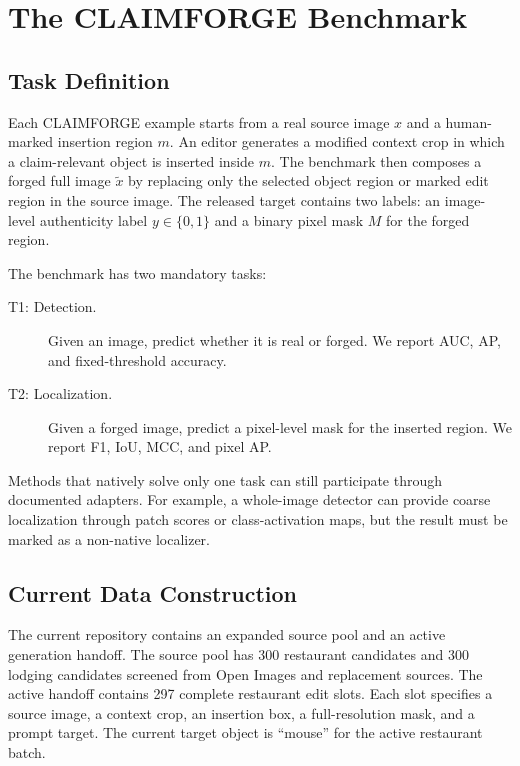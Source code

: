\section{The CLAIMFORGE Benchmark}
\label{sec:benchmark}

\subsection{Task Definition}

Each CLAIMFORGE example starts from a real source image $x$ and a human-marked insertion region $m$. An editor generates a modified context crop in which a claim-relevant object is inserted inside $m$. The benchmark then composes a forged full image $\tilde{x}$ by replacing only the selected object region or marked edit region in the source image. The released target contains two labels: an image-level authenticity label $y \in \{0,1\}$ and a binary pixel mask $M$ for the forged region.

The benchmark has two mandatory tasks:
\begin{description}
    \item[T1: Detection.] Given an image, predict whether it is real or forged. We report AUC, AP, and fixed-threshold accuracy.
    \item[T2: Localization.] Given a forged image, predict a pixel-level mask for the inserted region. We report F1, IoU, MCC, and pixel AP.
\end{description}
Methods that natively solve only one task can still participate through documented adapters. For example, a whole-image detector can provide coarse localization through patch scores or class-activation maps, but the result must be marked as a non-native localizer.

\subsection{Current Data Construction}

The current repository contains an expanded source pool and an active generation handoff. The source pool has 300 restaurant candidates and 300 lodging candidates screened from Open Images and replacement sources. The active handoff contains 297 complete restaurant edit slots. Each slot specifies a source image, a context crop, an insertion box, a full-resolution mask, and a prompt target. The current target object is ``mouse'' for the active restaurant batch.

